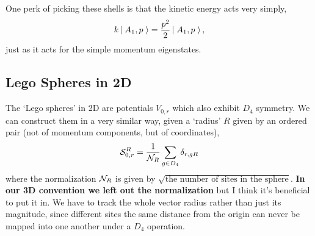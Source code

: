 One perk of picking these shells is that the kinetic energy acts very simply,
\begin{align}
    k \left|\;A_1, p\;\right\rangle = \frac{p^2}{2} \left|\;A_1, p\;\right\rangle,
\end{align}
just as it acts for the simple momentum eigenstates.

\subsection{Lego Spheres in 2D}

The `Lego spheres' in 2D are potentials $V_{0,r}$ which also exhibit $D_4$ symmetry.
We can construct them in a very similar way, given a `radius' $R$ given by an ordered pair (not of momentum components, but of coordinates),
\begin{align}
    \mathcal{S}^{R}_{0,r} = \frac{1}{\mathcal{N}_{R}}\sum_{g \in D_4} \delta_{r, gR}
\end{align}
where the normalization $\mathcal{N}_{R}$ is given by $\sqrt{\textrm{the number of sites in the sphere}}$.
{\bf In our 3D convention we left out the normalization} but I think it's beneficial to put it in.
We have to track the whole vector radius rather than just its magnitude, since different sites the same distance from the origin can never be mapped into one another under a $D_4$ operation.
